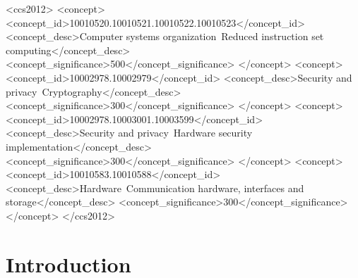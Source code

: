 \documentclass[sigconf]{acmart}
\begin{document}
\begin{CCSXML}
  <ccs2012>
     <concept>
         <concept_id>10010520.10010521.10010522.10010523</concept_id>
         <concept_desc>Computer systems organization~Reduced instruction set computing</concept_desc>
         <concept_significance>500</concept_significance>
         </concept>
     <concept>
         <concept_id>10002978.10002979</concept_id>
         <concept_desc>Security and privacy~Cryptography</concept_desc>
         <concept_significance>300</concept_significance>
         </concept>
     <concept>
         <concept_id>10002978.10003001.10003599</concept_id>
         <concept_desc>Security and privacy~Hardware security implementation</concept_desc>
         <concept_significance>300</concept_significance>
         </concept>
     <concept>
         <concept_id>10010583.10010588</concept_id>
         <concept_desc>Hardware~Communication hardware, interfaces and storage</concept_desc>
         <concept_significance>300</concept_significance>
         </concept>
   </ccs2012>
\end{CCSXML}
  



\maketitle

\section{Introduction}

\end{document}
